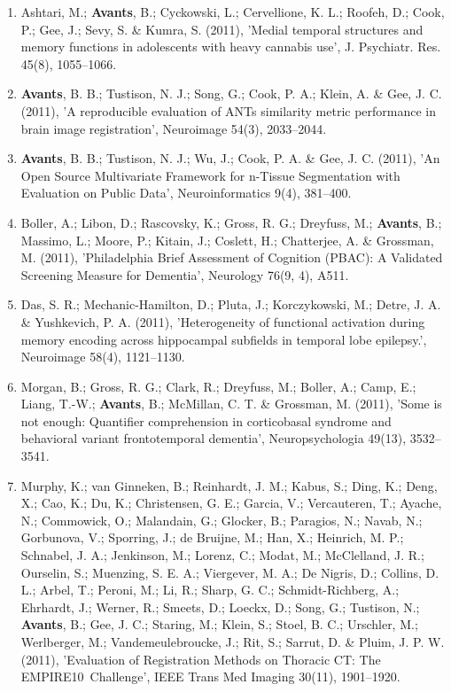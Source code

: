 \documentclass[11pt]{moderncv} %
\begin{document}
\begin{enumerate}
\item  Ashtari, M.; \textbf{Avants}, B.; Cyckowski, L.; Cervellione, K. L.; Roofeh, D.; Cook, P.; Gee, J.; Sevy, S. \&  Kumra, S. (2011), 'Medial temporal structures and memory functions in adolescents with heavy cannabis use', J. Psychiatr. Res. 45(8), 1055--1066.

\item  \textbf{Avants}, B. B.; Tustison, N. J.; Song, G.; Cook, P. A.; Klein, A. \&  Gee, J. C. (2011), 'A reproducible evaluation of ANTs similarity metric performance in brain image registration', Neuroimage 54(3), 2033--2044.

\item  \textbf{Avants}, B. B.; Tustison, N. J.; Wu, J.; Cook, P. A. \&  Gee, J. C. (2011), 'An Open Source Multivariate Framework for n-Tissue Segmentation with Evaluation on Public Data', Neuroinformatics 9(4), 381--400.

\item  Boller, A.; Libon, D.; Rascovsky, K.; Gross, R. G.; Dreyfuss, M.; \textbf{Avants}, B.; Massimo, L.; Moore, P.; Kitain, J.; Coslett, H.; Chatterjee, A. \&  Grossman, M. (2011), 'Philadelphia Brief Assessment of Cognition (PBAC): A Validated Screening Measure for Dementia', Neurology 76(9, 4), A511.

\item  Das, S. R.; Mechanic-Hamilton, D.; Pluta, J.; Korczykowski, M.; Detre, J. A. \&  Yushkevich, P. A. (2011), 'Heterogeneity of functional activation during memory encoding across hippocampal subfields in temporal lobe epilepsy.', Neuroimage 58(4), 1121--1130.

\item  Morgan, B.; Gross, R. G.; Clark, R.; Dreyfuss, M.; Boller, A.; Camp, E.; Liang, T.-W.; \textbf{Avants}, B.; McMillan, C. T. \&  Grossman, M. (2011), 'Some is not enough: Quantifier comprehension in corticobasal syndrome and behavioral variant frontotemporal dementia', Neuropsychologia 49(13), 3532--3541.

\item  Murphy, K.; van Ginneken, B.; Reinhardt, J. M.; Kabus, S.; Ding, K.; Deng, X.; Cao, K.; Du, K.; Christensen, G. E.; Garcia, V.; Vercauteren, T.; Ayache, N.; Commowick, O.; Malandain, G.; Glocker, B.; Paragios, N.; Navab, N.; Gorbunova, V.; Sporring, J.; de Bruijne, M.; Han, X.; Heinrich, M. P.; Schnabel, J. A.; Jenkinson, M.; Lorenz, C.; Modat, M.; McClelland, J. R.; Ourselin, S.; Muenzing, S. E. A.; Viergever, M. A.; De Nigris, D.; Collins, D. L.; Arbel, T.; Peroni, M.; Li, R.; Sharp, G. C.; Schmidt-Richberg, A.; Ehrhardt, J.; Werner, R.; Smeets, D.; Loeckx, D.; Song, G.; Tustison, N.; \textbf{Avants}, B.; Gee, J. C.; Staring, M.; Klein, S.; Stoel, B. C.; Urschler, M.; Werlberger, M.; Vandemeulebroucke, J.; Rit, S.; Sarrut, D. \&  Pluim, J. P. W. (2011), 'Evaluation of Registration Methods on Thoracic CT: The EMPIRE10~Challenge', IEEE Trans Med Imaging 30(11), 1901--1920.


\end{enumerate}
\end{document}
